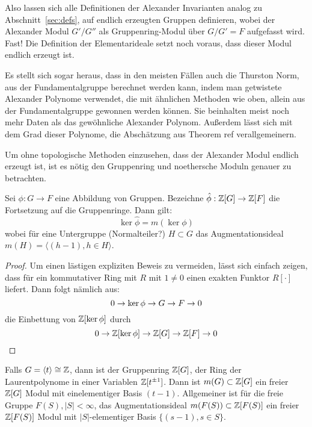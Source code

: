 Also lassen sich alle Definitionen der Alexander Invarianten analog zu Abschnitt~\ref{sec:defs}, auf endlich erzeugten Gruppen definieren, wobei der Alexander Modul $G'/G''$ als Gruppenring-Modul über $G/G'=F$ aufgefasst wird. Fast! Die Definition der Elementarideale setzt noch voraus, dass dieser Modul endlich erzeugt ist.


Es stellt sich sogar heraus, dass in den meisten Fällen auch die Thurston Norm, aus der Fundamentalgruppe berechnet werden kann, indem man getwistete Alexander Polynome verwendet, die mit ähnlichen Methoden wie oben, allein aus der Fundamentalgruppe gewonnen werden können. Sie beinhalten meist noch mehr Daten als das gewöhnliche Alexander Polynom. Außerdem lässt sich mit dem Grad dieser Polynome, die Abschätzung aus Theorem ref verallgemeinern.

Um ohne topologische Methoden einzusehen, dass der Alexander Modul endlich erzeugt ist, ist es nötig den Gruppenring und noethersche Moduln genauer zu betrachten.

\begin{lem}
	Sei $\phi:G \to F$ eine Abbildung von Gruppen. Bezeichne $\hat \phi: \mathbb{Z}[G] \to \mathbb{Z}[F]$ die Fortsetzung auf die Gruppenringe. Dann gilt:
	\[
		\ker\hat\phi = m(\ker\phi)
	\]
	wobei für eine Untergruppe (Normalteiler?) $H\subset G$ das Augmentationsideal $m(H) = \langle(h-1), h \in H\rangle$.
\end{lem}
\begin{proof}
	Um einen lästigen expliziten Beweis zu vermeiden, lässt sich einfach zeigen, dass für ein kommutativer Ring mit $R$ mit $1\neq 0$ einen exakten Funktor $R[\cdot]$ liefert. Dann folgt nämlich aus:
	\[
		0\to\ker\phi\to G\to F\to0
	\]
	die Einbettung von $\mathbb{Z}[\ker\phi]$ durch
	\[
		0\to\mathbb{Z}[\ker\phi]\to\mathbb{Z}[G]\to\mathbb{Z}[F]\to0
	\]
\end{proof}

\begin{bsp}
	Falls $G=\langle t \rangle \cong \mathbb{Z}$, dann ist der Gruppenring $\mathbb{Z} [G]$, der Ring der Laurentpolynome in einer Variablen $\mathbb{Z}[t^{\pm 1}]$. Dann ist $m(G) \subset \mathbb{Z}[G]$ ein freier $\mathbb{Z}[G]$ Modul mit einelementiger Basis $(t-1)$. Allgemeiner ist für die freie Gruppe $F(S), |S| < \infty$, das Augmentationsideal $m(F(S)) \subset \mathbb{Z}[F(S)]$ ein freier $\mathbb{Z}[F(S)]$ Modul mit $|S|$-elementiger Basis $\{(s-1), s \in S\}$.
\end{bsp}

